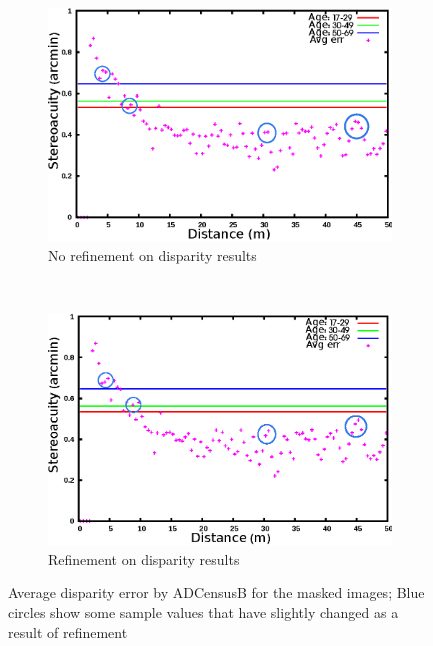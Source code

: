 \begin{figure}[H]
\centering
\begin{subfigure}{\linewidth}
\centering
\includegraphics[scale=0.95]{adcenmsk3NoLRmrk}
\caption{No refinement on disparity results}
\label{fig:adcmnoLR}
\vspace{2mm}
\end{subfigure}\\
\begin{subfigure}{\linewidth}
\centering
\includegraphics[scale=0.95]{adcenmsk3mrk}
\caption{Refinement on disparity results}
\label{fig:adcm3mrk}
\end{subfigure}
\caption{Average disparity error by ADCensusB for the masked images; Blue circles show some sample values that have slightly changed as a result of refinement}
\label{fig:adcMLRnoLR}
\end{figure} 

